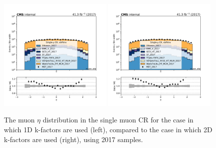 \begin{figure}
    \begin{center}
        \includegraphics[width=0.49\textwidth]{fig/datamc/cr_1m_vbf/cr_1m_vbf_muon_eta_losf_2017.pdf}
        \includegraphics[width=0.49\textwidth]{fig/datamc_2dkfac/cr_1m_vbf/cr_1m_vbf_muon_eta_losf_2017.pdf} 
        \caption{The muon $\eta$ distribution in the single muon CR for the case in which 1D k-factors are used (left), 
        compared to the case in which 2D k-factors are used (right), using 2017 samples.}
        \label{fig:muon_eta_2017}
    \end{center}
\end{figure}

